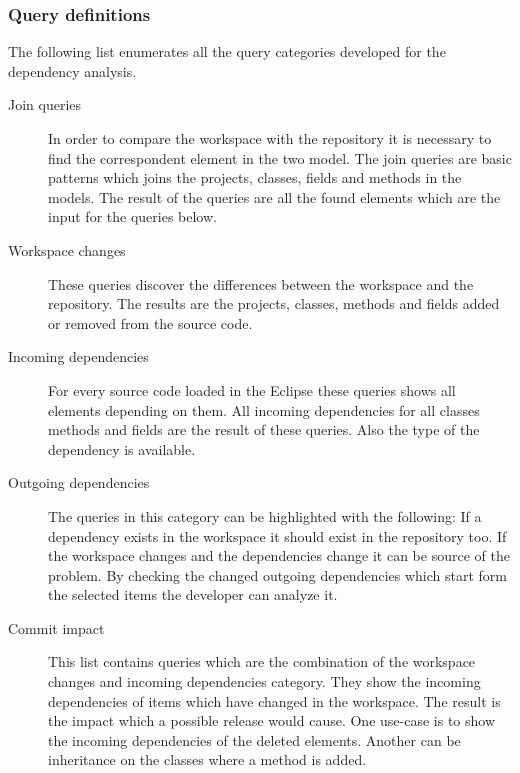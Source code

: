 \subsubsection{Query definitions}
The following list enumerates all the  query categories developed for the dependency
analysis.
\begin{description}	
\item[Join queries]
In order to compare the workspace with the repository it is necessary to find 
the correspondent element in the two model. The join queries are basic patterns 
which joins the projects, classes, fields and methods in the models. The result
of the queries are all the found elements which are the input for the queries 
below. 
\item[Workspace changes] These queries discover the differences between the 
workspace and the repository. The results are the projects, classes, methods
and fields added or removed from the source code.   
\item[Incoming dependencies] For every source code loaded in the Eclipse these
queries shows all elements depending  on them. All incoming dependencies for 
all classes methods and fields are the result of these queries. Also the type
of the dependency is available. 
\item[Outgoing dependencies] The queries in this category can be highlighted 
with the following: If a dependency exists in the workspace it should
exist in the repository too. If the workspace changes and the dependencies change
it can be source of the problem.  By checking the changed outgoing dependencies
which start form the selected items the developer can analyze it.
\item[Commit impact] This list contains queries which are the combination of 
the workspace changes and incoming dependencies category. They show the incoming
dependencies of items which have changed in the workspace. The result is the
impact which a possible release would cause.  One use-case is to show the
incoming dependencies of the deleted elements. Another can be inheritance on
the classes where a method is added.
\end{description}


